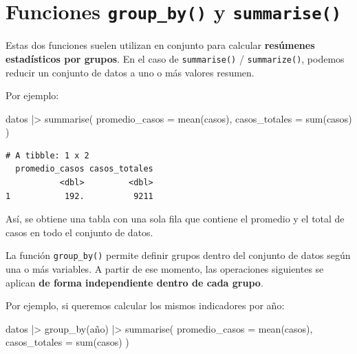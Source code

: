 \documentclass[
  spanish,
  a4paper,
]{scrbook}
\newenvironment{Shaded}{\begin{snugshade}}{\end{snugshade}}
\newcommand{\AttributeTok}[1]{\textcolor[rgb]{0.40,0.45,0.13}{#1}}
\newcommand{\FunctionTok}[1]{\textcolor[rgb]{0.28,0.35,0.67}{#1}}
\newcommand{\NormalTok}[1]{\textcolor[rgb]{0.00,0.23,0.31}{#1}}
\newcommand{\SpecialCharTok}[1]{\textcolor[rgb]{0.37,0.37,0.37}{#1}}
\begin{document}
\section{\texorpdfstring{Funciones \texttt{group\_by()} y
\texttt{summarise()}}{Funciones group\_by() y summarise()}}\label{funciones-group_by-y-summarise}

Estas dos funciones suelen utilizan en conjunto para calcular
\textbf{resúmenes estadísticos por grupos}. En el caso de
\texttt{summarise()} / \texttt{summarize()}, podemos reducir un conjunto
de datos a uno o más valores resumen.

Por ejemplo:

\begin{Shaded}
\begin{Highlighting}[]
\NormalTok{datos }\SpecialCharTok{|\textgreater{}}
  \FunctionTok{summarise}\NormalTok{(}
    \AttributeTok{promedio\_casos =} \FunctionTok{mean}\NormalTok{(casos),}
    \AttributeTok{casos\_totales =} \FunctionTok{sum}\NormalTok{(casos)}
\NormalTok{  )}
\end{Highlighting}
\end{Shaded}

\begin{verbatim}
# A tibble: 1 x 2
  promedio_casos casos_totales
           <dbl>         <dbl>
1           192.          9211
\end{verbatim}

Así, se obtiene una tabla con una sola fila que contiene el promedio y
el total de casos en todo el conjunto de datos.

La función \texttt{group\_by()} permite definir grupos dentro del
conjunto de datos según una o más variables. A partir de ese momento,
las operaciones siguientes se aplican \textbf{de forma independiente
dentro de cada grupo}.

Por ejemplo, si queremos calcular los mismos indicadores por año:

\begin{Shaded}
\begin{Highlighting}[]
\NormalTok{datos }\SpecialCharTok{|\textgreater{}}
  \FunctionTok{group\_by}\NormalTok{(año) }\SpecialCharTok{|\textgreater{}}
  \FunctionTok{summarise}\NormalTok{(}
    \AttributeTok{promedio\_casos =} \FunctionTok{mean}\NormalTok{(casos),}
    \AttributeTok{casos\_totales =} \FunctionTok{sum}\NormalTok{(casos)}
\NormalTok{  )}
\end{Highlighting}
\end{Shaded}
\end{document}
